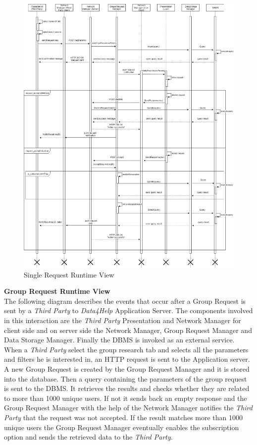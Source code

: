 \documentclass[titlepage]{article}
\begin{document}
\begin{figure}[H]
	\center
  	\includegraphics[width=15cm]{SingleRequest.png}
  	\caption{Single Request Runtime View}
 	\label{fig:SIGREQ}
\end{figure}
\noindent
{\bf Group Request Runtime View }\\ 
The following diagram describes the events that occur after a Group Request is sent by a {\it Third Party} to {\it Data4Help} Application Server. The components involved in this interaction are the {\it Third Party} Presentation and Network Manager for client side and  on server side the Network Manager, Group Request Manager and Data Storage Manager. Finally the DBMS is invoked as an external service.
When a {\it Third Party} select the group research tab and selects all the parameters and filters he is interested in, an HTTP request is sent to the Application server. A new Group Request is created by the Group Request Manager and it is stored into the database. Then a query containing the parameters of the group request is sent to the DBMS. It retrieves the results and checks whether they are related to more than 1000 unique users. If not it sends back an empty response and the Group Request Manager with the help of the Network Manager notifies the {\it Third Party} that the request was not accepted. If the result matches more than 1000 unique users the Group Request Manager eventually enables the subscription option and sends the retrieved data to the {\it Third Party}.
\end{document}
